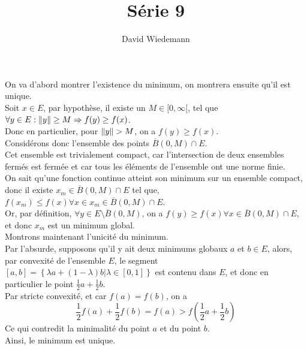 \documentclass[11pt, a4paper]{article}
\begin{document}
\title{Série 9}
\author{David Wiedemann}
\maketitle
On va d'abord montrer l'existence du minimum, on montrera ensuite qu'il est unique.\\
Soit $x \in E$, par hypothèse, il existe un $M \in [ 0, \infty [  $, tel que $\forall y \in E: \left\lVert y\right\rVert \geq M \Rightarrow f( y) \geq f( x) $.\\
Donc en particulier, pour $\left\lVert y\right\rVert > M$, on a $f( y) \geq f( x) $.\\
Considérons donc l'ensemble des points $ \overline{B}(0,M ) \cap E $.\\
Cet ensemble est trivialement  compact, car l'intersection de deux ensembles fermés est fermée et car tous les éléments de l'ensemble ont une norme finie.\\
On sait qu'une fonction continue atteint son minimum sur un ensemble compact, donc il existe $x_m \in \overline{B}(0,M ) \cap E $ tel que, $f( x_m) \leq  f( x) \forall x \in x_m \in \overline{B}(0,M ) \cap E$.\\
Or, par définition, $\forall y \in E \setminus \overline{B}( 0,M) $, on a $ f( y) \geq f( x) \forall x \in  \overline{B}(0,M ) \cap E$, et donc $x_m$ est un minimum global.\\
Montrons maintenant l'unicité du minimum.\\
Par l'absurde, supposons qu'il y ait deux minimums globaux $a$ et $b \in E$, alors, par convexité de l'ensemble $E$, le segment $[a,b]= \left\{ \lambda a + ( 1-\lambda) b | \lambda \in [ 0,1]  \right\} $	est contenu dans $E$, et donc en particulier le point $\frac{1}{2}a + \frac{1}{2}b$.\\
Par stricte convexité, et car $f( a) =f( b) $, on a 
\[ 
	\frac{1}{2}f( a) + \frac{1}{2}f( b) = f( a) > f( \frac{1}{2}a + \frac{1}{2}b) 
\]
Ce qui contredit la minimalité du point $a$ et du point $b$.\\
Ainsi, le minimum est unique.
\end{document}
